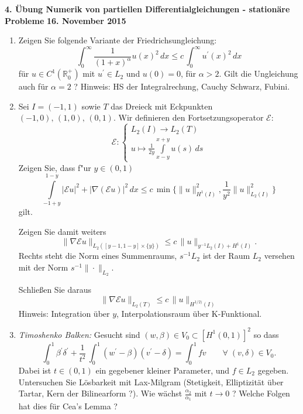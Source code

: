 \documentclass[11pt,a4paper]{report}
\newcommand{\R}[1]{\mathbb{R}^{#1}}
\begin{document}
\begin{center}
\textbf{4. \"Ubung Numerik von partiellen Differentialgleichungen - station\"are Probleme} \newline 
\textbf{16. November 2015}
\end{center}
\begin{enumerate}

\item 
Zeigen Sie folgende Variante der Friedrichsungleichung:
$$
\int_0^\infty  \frac{1} {(1+x)^\alpha} u(x)^2 \, dx \leq c \, \int_0^\infty
u^\prime(x)^2 \, dx
$$
f\"ur $u \in C^1(\R{+}_0)$ mit $u^\prime \in L_2$ und $u(0) = 0$,  f\"ur $\alpha > 2$. Gilt
die Ungleichung auch f\"ur $\alpha = 2$ ?
Hinweis: HS der Integralrechung, Cauchy Schwarz, Fubini. 


\item Sei $I=(-1, 1)$ sowie $T$ das Dreieck mit Eckpunkten $(-1,0),\,(1,0),\,(0,1)$. Wir definieren den Fortsetzungsoperator $\mathcal{E}$:
$$\mathcal{E}: \left\{
							\begin{matrix}   L_2(I) \rightarrow L_2(T) \\ 
					 									u \mapsto \frac{1}{2y}\int\limits_{x-y}^{x+y}u(s) \,ds
					    \end{matrix}\right.$$
Zeigen Sie, dass f"ur $y\in (0,1)$ 
$$\int\limits_{-1+y}^{1-y} |\mathcal{E}u|^2 + |\nabla(\mathcal{E}u)|^2\,dx \leq c\, \min\{\|u\|^2_{H^1(I)}, \frac{1}{y^2}\|u\|^2_{L_2(I)}\}$$
gilt.

Zeigen Sie damit weiters
$$
\| \nabla \mathcal{E}u \|_{L_2([y-1,1-y] \times \{y\}) } \leq c \, \|u \|_{y^{-1}L_2(I) + H^1(I)}. 
$$
Rechts steht die Norm eines Summenraums, $s^{-1}L_2$ ist der Raum $L_2$
versehen mit der \newline Norm $s^{-1}\| \cdot \|_{L_2}$.

Schlie\ss{}en Sie daraus
$$
\| \nabla \mathcal{E}u \|_{L_2(T) } \leq c \, \|u\|_{H^{1/2)}(I)}
  $$
Hinweis: Integration \"uber $y$, Interpolationsraum \"uber K-Funktional.

\item {\em Timoshenko Balken:} Gesucht sind $(w, \beta) \in V_0 \subset
  [H^1(0,1)]^2$ so dass
$$
\int_0^1 \beta^\prime \delta ^\prime + \frac{1}{t^2}\,\int_0^1
(w^\prime - \beta) (v^\prime - \delta) = \int_0^1 f v \qquad \forall \;
(v,\delta) \in V_0.
$$
Dabei ist $t \in (0,1)$ ein gegebener kleiner Parameter, und $f \in L_2$ gegeben. Untersuchen Sie L\"osbarkeit
mit Lax-Milgram (Stetigkeit, Elliptizit\"at \"uber Tartar, Kern der
Bilinearform ?). Wie
w\"achst $\frac{\alpha_2} {\alpha_1}$ mit $t \rightarrow 0$ ? Welche
Folgen hat dies f\"ur Cea's Lemma ?


\end{enumerate}
\end{document}
